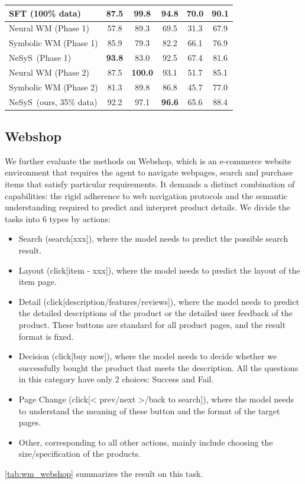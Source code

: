 \documentclass{article}
\theoremstyle{plain}
\theoremstyle{definition}
\theoremstyle{remark}
\newcommand{\ours}{{\sc NeSyS}\xspace}
\begin{document}
\begin{table}[ht]
\begin{tabular}{lccccc}
    \midrule
    SFT (100\% data) & 87.5 & 99.8 & 94.8 & \textbf{70.0} & \textbf{90.1} \\
    \midrule
    Neural WM (Phase 1) & 57.8 & 89.3 & 69.5 & 31.3 & 67.9 \\
    Symbolic WM (Phase 1) & 85.9 & 79.3 & 82.2 & 66.1 & 76.9 \\
    \ours\ (Phase 1) & \textbf{93.8} & 83.0 & 92.5 & 67.4 & 81.6 \\
    \midrule
    Neural WM (Phase 2) & 87.5 & \textbf{100.0} & 93.1 & 51.7 & 85.1 \\
    Symbolic WM (Phase 2) & 81.3 & 89.8 & 86.8 & 45.7 & 77.0 \\
    \ours~(ours, 35\% data) & 92.2 & 97.1 & \textbf{96.6} & 65.6 & 88.4 \\
    \bottomrule
  \end{tabular}
\end{table}
\subsection{Webshop}\label{sec:webshop}
We further evaluate the methods on Webshop, which is an e-commerce website environment that requires the agent to navigate webpages, search and purchase items that satisfy particular requirements. 
It demands a distinct combination of capabilities: the rigid adherence to web navigation protocols and the semantic understanding required to predict and interpret product details. We divide the tasks into 6 types by actions: 
\begin{itemize}
    \item Search (search[xxx]), where the model needs to predict the possible search result.
    \item Layout (click[item - xxx]), where the model needs to predict the layout of the item page.
    \item Detail (click[description/features/reviews]), where the model needs to predict the detailed descriptions of the product or the detailed user feedback of the product. These buttons are standard for all product pages, and the result format is fixed.
    \item Decision (click[buy now]), where the model needs to decide whether we successfully bought the product that meets the description. All the questions in this category have only 2 choices: Success and Fail.
    \item Page Change (click[< prev/next >/back to search]), where the model needs to understand the meaning of these button and the format of the target pages.
    \item Other, corresponding to all other actions, mainly include choosing the size/specification of the products. 
\end{itemize}
\cref{tab:wm_webshop} summarizes the result on this task.
\end{document}
